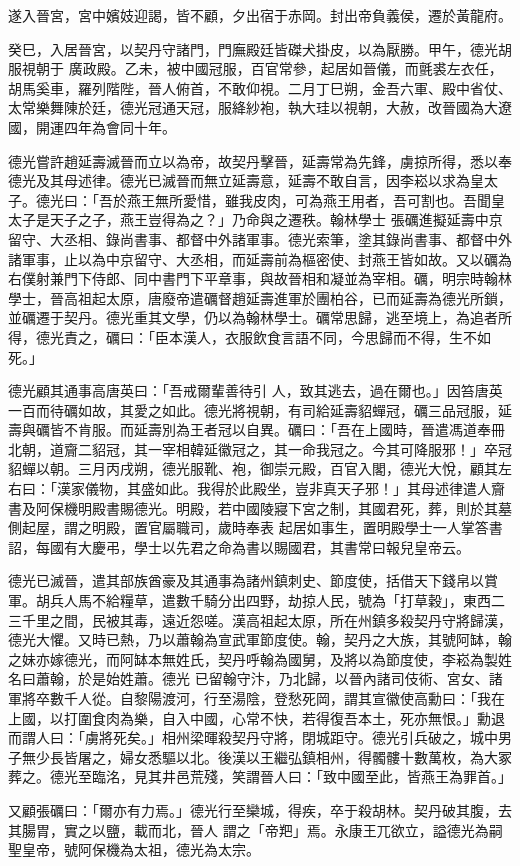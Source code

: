 \begin{pinyinscope}
 遂入晉宮，宮中嬪妓迎謁，皆不顧，夕出宿于赤岡。封出帝負義侯，遷於黃龍府。



 癸巳，入居晉宮，以契丹守諸門，門廡殿廷皆磔犬掛皮，以為厭勝。甲午，德光胡服視朝于
 廣政殿。乙未，被中國冠服，百官常參，起居如晉儀，而氈裘左衣任，胡馬奚車，羅列階陛，晉人俯首，不敢仰視。二月丁巳朔，金吾六軍、殿中省仗、太常樂舞陳於廷，德光冠通天冠，服絳紗袍，執大珪以視朝，大赦，改晉國為大遼國，開運四年為會同十年。



 德光嘗許趙延壽滅晉而立以為帝，故契丹擊晉，延壽常為先鋒，虜掠所得，悉以奉德光及其母述律。德光已滅晉而無立延壽意，延壽不敢自言，因李崧以求為皇太子。德光曰：「吾於燕王無所愛惜，雖我皮肉，可為燕王用者，吾可割也。吾聞皇太子是天子之子，燕王豈得為之？」乃命與之遷秩。翰林學士
 張礪進擬延壽中京留守、大丞相、錄尚書事、都督中外諸軍事。德光索筆，塗其錄尚書事、都督中外諸軍事，止以為中京留守、大丞相，而延壽前為樞密使、封燕王皆如故。又以礪為右僕射兼門下侍郎、同中書門下平章事，與故晉相和凝並為宰相。礪，明宗時翰林學士，晉高祖起太原，唐廢帝遣礪督趙延壽進軍於團柏谷，已而延壽為德光所鎖，並礪遷于契丹。德光重其文學，仍以為翰林學士。礪常思歸，逃至境上，為追者所得，德光責之，礪曰：「臣本漢人，衣服飲食言語不同，今思歸而不得，生不如死。」



 德光顧其通事高唐英曰：「吾戒爾輩善待引
 人，致其逃去，過在爾也。」因笞唐英一百而待礪如故，其愛之如此。德光將視朝，有司給延壽貂蟬冠，礪三品冠服，延壽與礪皆不肯服。而延壽別為王者冠以自異。礪曰：「吾在上國時，晉遣馮道奉冊北朝，道齎二貂冠，其一宰相韓延徽冠之，其一命我冠之。今其可降服邪！」卒冠貂蟬以朝。三月丙戌朔，德光服靴、袍，御崇元殿，百官入閣，德光大悅，顧其左右曰：「漢家儀物，其盛如此。我得於此殿坐，豈非真天子邪！」其母述律遣人齎書及阿保機明殿書賜德光。明殿，若中國陵寢下宮之制，其國君死，葬，則於其墓側起屋，謂之明殿，置官屬職司，歲時奉表
 起居如事生，置明殿學士一人掌答書詔，每國有大慶弔，學士以先君之命為書以賜國君，其書常曰報兒皇帝云。



 德光已滅晉，遣其部族酋豪及其通事為諸州鎮刺史、節度使，括借天下錢帛以賞軍。胡兵人馬不給糧草，遣數千騎分出四野，劫掠人民，號為「打草穀」，東西二三千里之間，民被其毒，遠近怨嗟。漢高祖起太原，所在州鎮多殺契丹守將歸漢，德光大懼。又時已熱，乃以蕭翰為宣武軍節度使。翰，契丹之大族，其號阿缽，翰之妹亦嫁德光，而阿缽本無姓氏，契丹呼翰為國舅，及將以為節度使，李崧為製姓名曰蕭翰，於是始姓蕭。德光
 已留翰守汴，乃北歸，以晉內諸司伎術、宮女、諸軍將卒數千人從。自黎陽渡河，行至湯陰，登愁死岡，謂其宣徽使高勳曰：「我在上國，以打圍食肉為樂，自入中國，心常不快，若得復吾本土，死亦無恨。」勳退而謂人曰：「虜將死矣。」相州梁暉殺契丹守將，閉城距守。德光引兵破之，城中男子無少長皆屠之，婦女悉驅以北。後漢以王繼弘鎮相州，得髑髏十數萬枚，為大冢葬之。德光至臨洺，見其井邑荒殘，笑謂晉人曰：「致中國至此，皆燕王為罪首。」



 又顧張礪曰：「爾亦有力焉。」德光行至欒城，得疾，卒于殺胡林。契丹破其腹，去其腸胃，實之以鹽，載而北，晉人
 謂之「帝羓」焉。永康王兀欲立，謚德光為嗣聖皇帝，號阿保機為太祖，德光為太宗。



\end{pinyinscope}